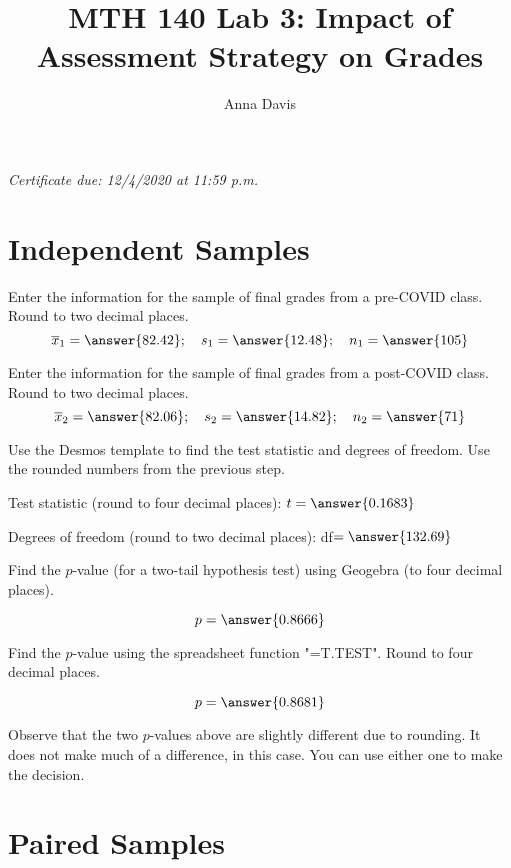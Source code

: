 \documentclass{ximera}
\author{Anna Davis} \title{MTH 140 Lab 3: Impact of Assessment Strategy on Grades}
\begin{document}
\begin{abstract}

\end{abstract}
\maketitle
 \textit{Certificate due: 12/4/2020 at 11:59 p.m.}
 \section{Independent Samples}
\begin{problem}\label{prob:140lab3prob1}
Enter the information for the sample of final grades from a pre-COVID class.
Round to two decimal places.
$$\overline{x}_1=\answer{82.42};\quad s_1=\answer{12.48};\quad n_1=\answer{105}$$

Enter the information for the sample of final grades from a post-COVID class.
Round to two decimal places.
$$\overline{x}_2=\answer{82.06};\quad s_2=\answer{14.82};\quad n_2=\answer{71}$$

Use the Desmos template to find the test statistic and degrees of freedom.  Use the rounded numbers from the previous step.

Test statistic (round to four decimal places): $t=\answer{0.1683}$

Degrees of freedom (round to two decimal places): df$=\answer{132.69}$

Find the $p$-value (for a two-tail hypothesis test) using Geogebra (to four decimal places).

\begin{center}  
\end{center}

$$p=\answer{0.8666}$$

Find the $p$-value using the spreadsheet function "=T.TEST".  Round to four decimal places.

$$p=\answer{0.8681}$$

\end{problem}

\begin{warning}
Observe that the two $p$-values above are slightly different due to rounding.  It does not make much of a difference, in this case.  You can use either one to make the decision.
\end{warning}


\section{Paired Samples}
\end{document}
